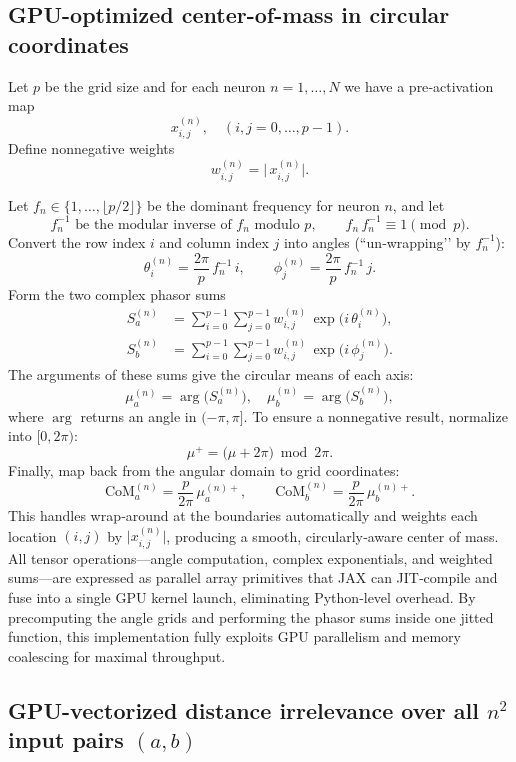 \documentclass{article} %
\theoremstyle{plain}
\theoremstyle{definition}
\newtheorem{empirical fact}[theorem]{Empirical Fact}
\begin{document}
\subsection{GPU-optimized center-of-mass in circular coordinates}

Let \(p\) be the grid size and for each neuron \(n=1,\dots,N\) we have a pre‑activation map
\[
x^{(n)}_{i,j},
\quad
(i,j=0,\dots,p-1).
\]
Define nonnegative weights
\[
w^{(n)}_{i,j}
=\bigl|\,x^{(n)}_{i,j}\bigr|.
\]

Let \(f_n\in\{1,\dots,\lfloor p/2\rfloor\}\) be the dominant frequency for neuron \(n\), and let
\[
f_n^{-1}\text{ be the modular inverse of }f_n\text{ modulo }p,
\qquad
f_n\,f_n^{-1}\equiv1\pmod p.
\]
Convert the row index \(i\) and column index \(j\) into angles (``un‑wrapping’’ by \(f_n^{-1}\)):
\[
\theta_i^{(n)} = \frac{2\pi}{p}\,f_n^{-1}\,i,
\qquad
\phi_j^{(n)}   = \frac{2\pi}{p}\,f_n^{-1}\,j.
\]
Form the two complex phasor sums
\begin{align*}
S_a^{(n)}
&=
\sum_{i=0}^{p-1}\sum_{j=0}^{p-1}
w^{(n)}_{i,j}\,\exp\!\bigl(i\,\theta_i^{(n)}\bigr),
\\
S_b^{(n)}
&=
\sum_{i=0}^{p-1}\sum_{j=0}^{p-1}
w^{(n)}_{i,j}\,\exp\!\bigl(i\,\phi_j^{(n)}\bigr).
\end{align*}
The arguments of these sums give the circular means of each axis:
\[
\mu_a^{(n)} = \arg\bigl(S_a^{(n)}\bigr),
\quad
\mu_b^{(n)} = \arg\bigl(S_b^{(n)}\bigr),
\]
where \(\arg\) returns an angle in \((-\pi,\pi]\).  To ensure a nonnegative result, normalize into \([0,2\pi)\):
\[
\mu^+ = \bigl(\mu + 2\pi\bigr)\bmod 2\pi.
\]
Finally, map back from the angular domain to grid coordinates:
\[
\mathrm{CoM}_a^{(n)}
= \frac{p}{2\pi}\,\mu_a^{(n)+},
\qquad
\mathrm{CoM}_b^{(n)}
= \frac{p}{2\pi}\,\mu_b^{(n)+}.
\]
This handles wrap‑around at the boundaries automatically and weights each location \((i,j)\) by \(\lvert x^{(n)}_{i,j}\rvert\), producing a smooth, circularly‑aware center of mass. All tensor operations—angle computation, complex exponentials, and weighted sums—are expressed as parallel array primitives that JAX can JIT‑compile and fuse into a single GPU kernel launch, eliminating Python‐level overhead. By precomputing the angle grids and performing the phasor sums inside one jitted function, this implementation fully exploits GPU parallelism and memory coalescing for maximal throughput.


\subsection{GPU-vectorized distance irrelevance over all $n^2$ input pairs $(a,b)$}
\end{document}
